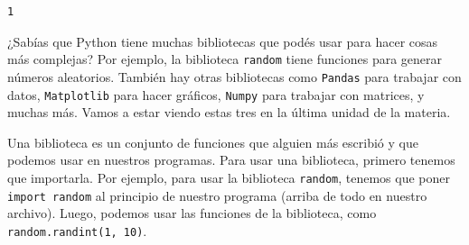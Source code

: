 \documentclass[
  letterpaper,
  DIV=11,
  numbers=noendperiod]{scrreprt}
\begin{document}
\begin{verbatim}
1
\end{verbatim}

\begin{tcolorbox}[enhanced jigsaw, opacitybacktitle=0.6, toptitle=1mm, toprule=.15mm, arc=.35mm, breakable, bottomrule=.15mm, opacityback=0, leftrule=.75mm, rightrule=.15mm, title=\textcolor{quarto-callout-note-color}{\faInfo}\hspace{0.5em}{Tip: Bibliotecas}, left=2mm, bottomtitle=1mm, colframe=quarto-callout-note-color-frame, colback=white, titlerule=0mm, coltitle=black, colbacktitle=quarto-callout-note-color!10!white]

¿Sabías que Python tiene muchas bibliotecas que podés usar para hacer
cosas más complejas? Por ejemplo, la biblioteca \texttt{random} tiene
funciones para generar números aleatorios. También hay otras bibliotecas
como \texttt{Pandas} para trabajar con datos, \texttt{Matplotlib} para
hacer gráficos, \texttt{Numpy} para trabajar con matrices, y muchas más.
Vamos a estar viendo estas tres en la última unidad de la materia.

Una biblioteca es un conjunto de funciones que alguien más escribió y
que podemos usar en nuestros programas. Para usar una biblioteca,
primero tenemos que importarla. Por ejemplo, para usar la biblioteca
\texttt{random}, tenemos que poner \texttt{import\ random} al principio
de nuestro programa (arriba de todo en nuestro archivo). Luego, podemos
usar las funciones de la biblioteca, como
\texttt{random.randint(1,\ 10)}.

\end{tcolorbox}
\end{document}
